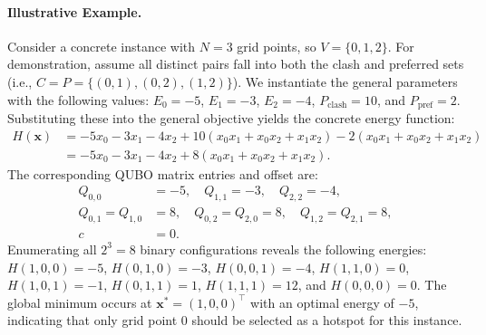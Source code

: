 \documentclass[12pt]{article}
\begin{document}
\paragraph{Illustrative Example.}
Consider a concrete instance with $N=3$ grid points, so $V = \{0, 1, 2\}$. For demonstration, assume all distinct pairs fall into both the clash and preferred sets (i.e., $C = P = \{(0,1), (0,2), (1,2)\}$). We instantiate the general parameters with the following values: $E_0 = -5$, $E_1 = -3$, $E_2 = -4$, $P_{\text{clash}} = 10$, and $P_{\text{pref}} = 2$. Substituting these into the general objective yields the concrete energy function:
\begin{align}
    H(\mathbf{x}) &= -5x_0 - 3x_1 - 4x_2 + 10(x_0x_1 + x_0x_2 + x_1x_2) - 2(x_0x_1 + x_0x_2 + x_1x_2) \\
    &= -5x_0 - 3x_1 - 4x_2 + 8(x_0x_1 + x_0x_2 + x_1x_2).
\end{align}
The corresponding QUBO matrix entries and offset are:
\begin{align}
    Q_{0,0} &= -5, \quad Q_{1,1} = -3, \quad Q_{2,2} = -4, \\
    Q_{0,1} = Q_{1,0} &= 8, \quad Q_{0,2} = Q_{2,0} = 8, \quad Q_{1,2} = Q_{2,1} = 8, \\
    c &= 0.
\end{align}
Enumerating all $2^3 = 8$ binary configurations reveals the following energies: $H(1,0,0) = -5$, $H(0,1,0) = -3$, $H(0,0,1) = -4$, $H(1,1,0) = 0$, $H(1,0,1) = -1$, $H(0,1,1) = 1$, $H(1,1,1) = 12$, and $H(0,0,0) = 0$. The global minimum occurs at $\mathbf{x}^* = (1, 0, 0)^\top$ with an optimal energy of $-5$, indicating that only grid point $0$ should be selected as a hotspot for this instance.
\end{document}
